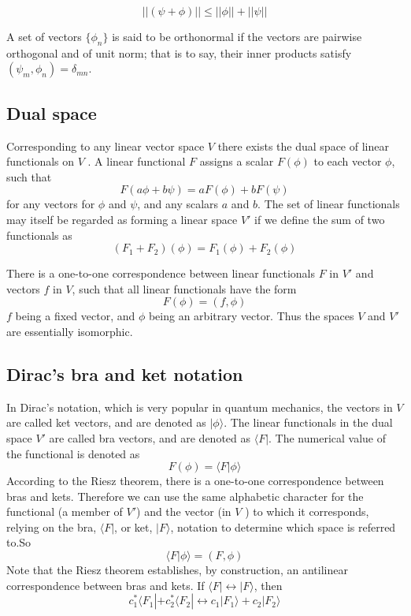 \documentclass[cyan]{elegantnote}
\begin{document}
\begin{newthem}
\[||(\psi+\phi)|| \leq ||\phi|| + ||\psi||\]
\end{newthem}

\begin{newdef}[Orthonormal]
A set of vectors $\{\phi_n\}$ is said to be orthonormal if the vectors are pairwise orthogonal and of unit norm; that is to say, their inner products satisfy $(\psi_m,\phi_n) = \delta_{mn}$.
\end{newdef}

\subsection{Dual space}
\begin{newdef}
Corresponding to any linear vector space $V$ there exists the dual space of linear functionals on $V$ . A linear functional $F$ assigns a scalar $F(\phi)$ to each vector $\phi$, such that
\[F(a\phi+b\psi) = aF(\phi) + bF(\psi)\]
for any vectors for $\phi$ and $\psi$, and any scalars $a$ and $b$. The set of linear functionals may itself be regarded as forming a linear space $V'$ if we define the sum of two functionals as
\[(F_1+F_2)(\phi) = F_1(\phi) + F_2(\phi)\]
\end{newdef}

\begin{newthem} 
There is a one-to-one correspondence between linear functionals $F$ in $V'$ and vectors $f$ in $V$, such that all linear functionals have the form
\[F(\phi) = (f,\phi)\]
$f$ being a fixed vector, and $\phi$ being an arbitrary vector. Thus the spaces $V$ and $V'$ are essentially isomorphic.
\end{newthem}

\subsection{Dirac's bra and ket notation}
\noindent
In Dirac’s notation, which is very popular in quantum mechanics, the vectors in $V$ are called ket vectors, and are denoted as $|\phi \rangle$. The linear functionals in the dual space $V'$ are called bra vectors, and are denoted as $\langle F |$. The numerical value of the functional is denoted as
\[F(\phi) = \langle F | \phi \rangle\]
According to the Riesz theorem, there is a one-to-one correspondence between bras and kets. Therefore we can use the same alphabetic character for the functional (a member of $V'$) and the vector (in $V$ ) to which it corresponds, relying on the bra, $\langle F |$, or ket, $|F\rangle$, notation to determine which space is referred to.So
\[\langle F | \phi \rangle = (F,\phi)\]
Note that the Riesz theorem establishes, by construction, an antilinear correspondence between bras and kets. If $\langle F | \leftrightarrow  |F\rangle$, then
\[c_1^* \langle F_1 | + c_2^* \langle F_2 | \leftrightarrow  c_1 |F_1\rangle + c_2|F_2\rangle\]
\end{document}

